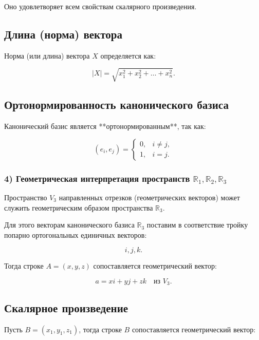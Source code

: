 {Оно удовлетворяет всем свойствам скалярного произведения.

\subsection*{Длина (норма) вектора}

Норма (или длина) вектора \( X \) определяется как:



\[
|X| = \sqrt{x_1^2 + x_2^2 + \dots + x_n^2}.
\]



\subsection*{Ортонормированность канонического базиса}

Канонический базис является **ортонормированным**, так как:



\[
(e_i, e_j) =
\begin{cases}
0, & i \neq j, \\
1, & i = j.
\end{cases}
\]

\subsubsection*{4) Геометрическая интерпретация пространств \( \mathbb{R}_1, \mathbb{R}_2, \mathbb{R}_3 \)}

Пространство \( V_3 \) направленных отрезков (геометрических векторов) может служить геометрическим образом пространства \( \mathbb{R}_3 \). 

Для этого векторам канонического базиса \( \mathbb{R}_3 \) поставим в соответствие тройку попарно ортогональных единичных векторов:



\[
i, j, k.
\]



Тогда строке \( A = (x, y, z) \) сопоставляется геометрический вектор:



\[
a = x i + y j + z k \quad \text{из } V_3.
\]



\subsection*{Скалярное произведение}

Пусть \( B = (x_1, y_1, z_1) \), тогда строке \( B \) сопоставляется геометрический вектор:



}
